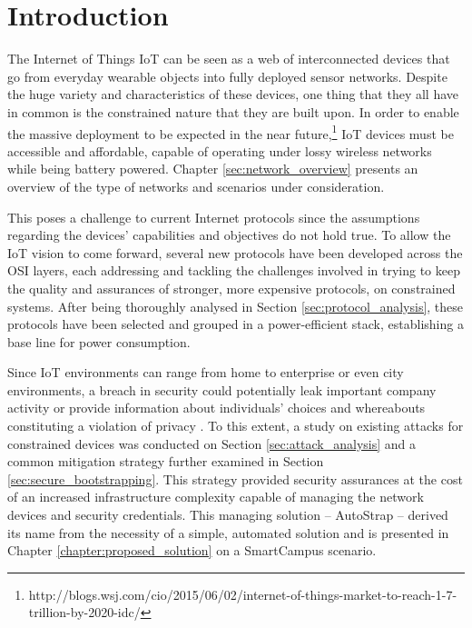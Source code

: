 
\chapter{Introduction}
\label{chapter:introduction}

\cite{Trappe2015}
The Internet of Things \gls{IoT} can be seen as a web of interconnected devices that go from everyday wearable objects into fully deployed sensor networks. Despite the huge variety and characteristics of these devices, one thing that they all have in common is the constrained nature that they are built upon. In order to enable the massive deployment to be expected in the near future,\footnote{http://blogs.wsj.com/cio/2015/06/02/internet-of-things-market-to-reach-1-7-trillion-by-2020-idc/} \gls{IoT} devices must be accessible and affordable, capable of operating under lossy wireless networks while being battery powered. Chapter \ref{sec:network_overview} presents an overview of the type of networks and scenarios under consideration.

	This poses a challenge to current Internet protocols since the assumptions regarding the devices' capabilities and objectives do not hold true. To allow the \gls{IoT} vision to come forward, several new protocols have been developed across the OSI layers, each addressing and tackling the challenges involved in trying to keep the quality and assurances of stronger, more expensive protocols, on constrained systems. After being thoroughly analysed in Section \ref{sec:protocol_analysis}, these protocols have been selected and grouped in a power-efficient stack, establishing a base line for power consumption. 
	
	Since \gls{IoT} environments can range from home to enterprise or even city environments, a breach in security could potentially leak important company activity or provide information about individuals' choices and whereabouts constituting a violation of privacy \cite{Ukil2015}. To this extent, a study on existing attacks for constrained devices was conducted on Section \ref{sec:attack_analysis} and a common mitigation strategy further examined in Section \ref{sec:secure_bootstrapping}. This strategy provided security assurances at the cost of an increased infrastructure complexity capable of managing the network devices and security credentials. This managing solution -- AutoStrap -- derived its name from the necessity of a simple, automated solution and is presented in Chapter \ref{chapter:proposed_solution} on a SmartCampus scenario. 
	
